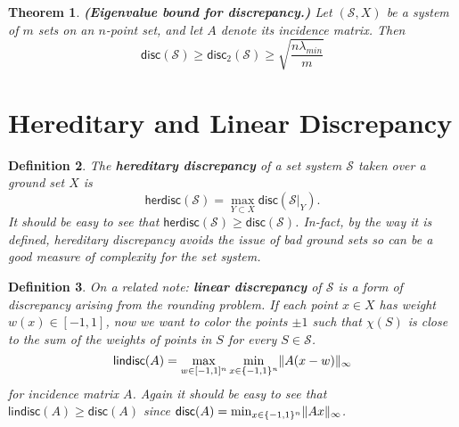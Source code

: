 \documentclass[twoside]{article}
\newcounter{lecnum}
\newtheorem{theorem}{Theorem}[lecnum]
\newtheorem{definition}[theorem]{Definition}
\newcommand\disc{\mathsf{disc}}
\newcommand\SSet{\mathcal{S}}
\newcommand\herdisc{\mathsf{herdisc}}
\newcommand\lindisc{\mathsf{lindisc}}
\DeclarePairedDelimiter\norm{\parallel}{\parallel}
\begin{document}
\begin{theorem}
\label{thm:eigbounddisc}
\textbf{(Eigenvalue bound for discrepancy.)} Let $(\SSet, X)$ be a system of $m$ sets on an $n$-point set, and let $A$ denote its incidence matrix. Then 
\[\disc(\SSet) \geq \disc_2(\SSet) \geq \sqrt{\frac{n\lambda_{min}}{m}}\]
\end{theorem}

\section{Hereditary and Linear Discrepancy}
\begin{definition}
The \textbf{hereditary discrepancy} of a set system $\SSet$ taken over a ground set $X$ is
\[\herdisc(\SSet) = \max_{Y \subset X} \disc(\SSet|_{Y}).\]
It should be easy to see that $\herdisc(\SSet) \geq \disc(\SSet)$. In-fact, by the way it is defined, hereditary discrepancy avoids the issue of \emph{bad} ground sets so can be a good measure of complexity for the set system.
\end{definition}

\begin{definition}
On a related note: \textbf{linear discrepancy} of $\SSet$ is a form of discrepancy arising from the rounding problem. If each point $x \in X$ has weight $w(x) \in [-1, 1]$, now we want to color the points $\pm 1$ such that $\chi(S)$ is close to the sum of the weights of points in $S$ for every $S \in \SSet$.
\[\lindisc(A) = \max_{w\in [-1,1]^n} \min_{x \in \{-1, 1\}^n} \norm{A(x-w)}_{\infty}\]
for incidence matrix $A$. Again it should be easy to see that $\lindisc(A) \geq \disc(A)$ since $\disc(A) = \min_{x \in \{-1, 1\}^n} \norm{Ax}_{\infty}$. 
\end{definition}
\end{document}
